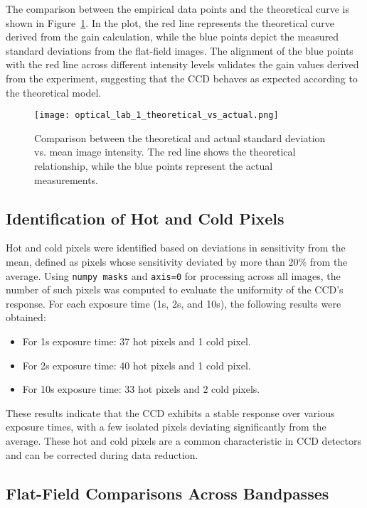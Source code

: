 \documentclass[linenumbers,twocolumn]{aastex631}
\begin{document}
The comparison between the empirical data points and the theoretical curve is shown in Figure~\ref{fig:theoretical_vs_actual}. In the plot, the red line represents the theoretical curve derived from the gain calculation, while the blue points depict the measured standard deviations from the flat-field images. The alignment of the blue points with the red line across different intensity levels validates the gain values derived from the experiment, suggesting that the CCD behaves as expected according to the theoretical model.

\begin{figure}[h]
    \centering
    \texttt{[image: optical\_lab\_1\_theoretical\_vs\_actual.png]}
    \caption{Comparison between the theoretical and actual standard deviation vs. mean image intensity. The red line shows the theoretical relationship, while the blue points represent the actual measurements.}
    \label{fig:theoretical_vs_actual}
\end{figure}

\subsection{Identification of Hot and Cold Pixels}
Hot and cold pixels were identified based on deviations in sensitivity from the mean, defined as pixels whose sensitivity deviated by more than 20\% from the average. Using \texttt{numpy masks} and \texttt{axis=0} for processing across all images, the number of such pixels was computed to evaluate the uniformity of the CCD’s response. For each exposure time (1s, 2s, and 10s), the following results were obtained:
\begin{itemize}
    \item For 1s exposure time: 37 hot pixels and 1 cold pixel.
    \item For 2s exposure time: 40 hot pixels and 1 cold pixel.
    \item For 10s exposure time: 33 hot pixels and 2 cold pixels.
\end{itemize}

These results indicate that the CCD exhibits a stable response over various exposure times, with a few isolated pixels deviating significantly from the average. These hot and cold pixels are a common characteristic in CCD detectors and can be corrected during data reduction.

\subsection{Flat-Field Comparisons Across Bandpasses}
\end{document}
